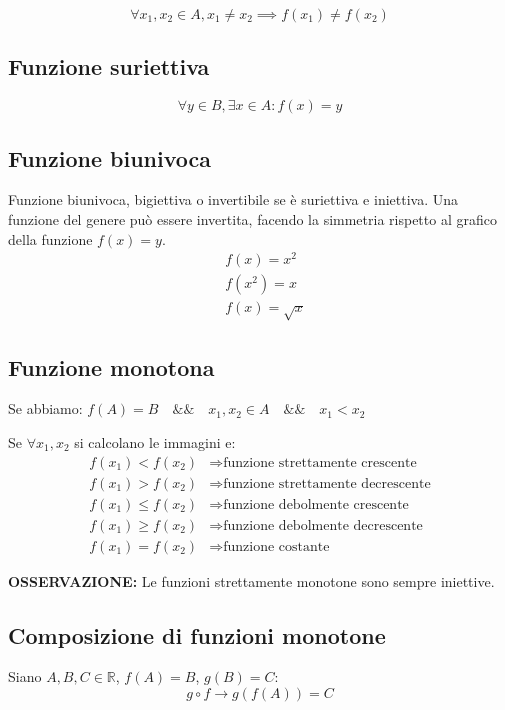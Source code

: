 \documentclass[12pt,a4paper]{article}
\begin{document}
\[
\forall x_1,x_2 \in A, x_1 \neq x_2 \implies f(x_1) \neq f(x_2)
\]

\subsection{Funzione suriettiva}

\[
\forall y \in B, \exists x \in A : f(x)=y
\]

\subsection{Funzione biunivoca}

Funzione biunivoca, bigiettiva o invertibile se è suriettiva e iniettiva.  
Una funzione del genere può essere invertita, facendo la simmetria rispetto al grafico della funzione $f(x)=y$.  
\begin{align*}
    &f(x)=x^2\\
    &f(x^2)= x\\
    &f(x) = \sqrt{x}
\end{align*} 

\subsection{Funzione monotona}

Se abbiamo:  
$f(A)=B \quad \&\& \quad x_1,x_2 \in A \quad \&\& \quad x_1<x_2$  

Se $\forall x_1,x_2$ si calcolano le immagini e:  
\begin{align*}
f(x_1)<f(x_2) &\Rightarrow \text{funzione strettamente crescente} \\
f(x_1)>f(x_2) &\Rightarrow \text{funzione strettamente decrescente} \\
f(x_1)\le f(x_2) &\Rightarrow \text{funzione debolmente crescente} \\
f(x_1)\ge f(x_2) &\Rightarrow \text{funzione debolmente decrescente} \\
f(x_1)=f(x_2) &\Rightarrow \text{funzione costante}
\end{align*}

\textbf{OSSERVAZIONE:} Le funzioni strettamente monotone sono sempre iniettive.  

\subsection{Composizione di funzioni monotone}

Siano $A,B,C \in \mathbb{R}$, $f(A)=B$, $g(B)=C$:  
\[
g \circ f \to g(f(A)) = C
\]
\end{document}

